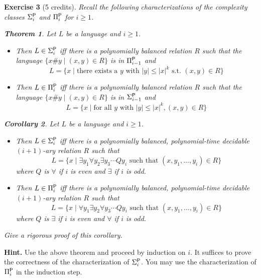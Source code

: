 \documentclass [11pt]{article}
\newcommand{\ccfont}[1]{\protect\mathsf{#1}}
\newcommand{\Ptime}{\ccfont{P}}
\newcommand{\phs}[1]{\Sigma_{#1}^{\Ptime}}
\newcommand{\php}[1]{\Pi_{#1}^{\Ptime}}
\newtheorem{theorem}{Theorem}
\newtheorem{corollary}[theorem]{Corollary}
\newtheorem{exercise}[theorem]{Exercise}
\begin{document}
\noindent
\begin{exercise}[5 credits]
{\em 
Recall the following characterizations of the complexity classes 
$\phs{i}$ and $\php{i}$ for $i \geq 1$. 
}%


\medskip

\noindent
\begin{theorem}
\label{thm:main}
Let $L$ be a language and $i \geq 1$. 
\begin{itemize}
\item Then $L \in \phs{i}$ iff there is
a polynomially balanced relation $R$ such that the language 
$\{x\# y \mid (x,y) \in R\}$ is in $\php{i-1}$ and 
\[
L = \{x \mid \mbox{there exists a } y 
\mbox{ with } |y| \leq |x|^k
\mbox{ s.t. } (x,y) \in R\}
\]
\item Then $L \in \php{i}$ iff there is
a polynomially balanced relation $R$ such that the language 
$\{x\# y \mid (x,y) \in R\}$ is in $\phs{i-1}$ and 
\[
L = \{x \mid \mbox{for all } y \mbox{ with } |y| \leq |x|^k, (x,y) \in R\}
\]
\end{itemize}
\end{theorem}

\medskip
\begin{corollary}
Let $L$ be a language and $i \geq 1$.
\begin{itemize}
\item  Then $L \in \phs{i}$ iff there is
a polynomially balanced, polynomial-time decidable $(i+1)$-ary
relation $R$ such that 
\[
L = \{x \mid \exists y_1 \forall y_2\exists y_3\cdots Q y_i \mbox{ such
that } 
(x,y_1,\ldots,y_i) \in R\}
\]
where $Q$ is $\forall$ if $i$ is even and $\exists$ if $i$ is odd. 

\item 
Then $L \in \php{i}$ iff there is
a polynomially balanced, polynomial-time decidable $(i+1)$-ary
relation $R$ such that 
\[
L = \{x \mid \forall y_1 \exists y_2\forall y_3\cdots Q y_i \mbox{ such
that } 
(x,y_1,\ldots,y_i) \in R\}
\]
where $Q$ is $\exists$ if $i$ is even and $\forall$ if $i$ is odd. 
\end{itemize}
\end{corollary}


\medskip
\noindent
{\em 
Give a rigorous proof of this corollary.
}%
\end{exercise}

\noindent
{\bf Hint.} Use the above theorem and proceed by induction on $i$.
It suffices to prove the correctness of the characterization of 
$\phs{i}$. You may use the characterization of $\php{i}$ in the induction step.
\end{document}
